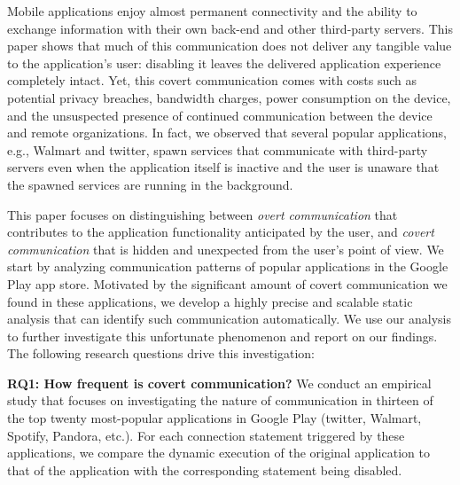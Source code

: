 Mobile applications enjoy almost permanent connectivity and the
ability to exchange information with their own back-end and other
third-party servers.  This paper shows that much of this communication
does not deliver any tangible value to the application's user:
disabling it leaves the delivered application experience completely
intact.  Yet, this covert communication comes with costs such as
potential privacy breaches, bandwidth charges, power consumption on
the device, and the unsuspected presence of continued communication
between the device and remote organizations. In fact, we observed that
several popular applications, e.g., Walmart and twitter, spawn
services that communicate with third-party servers even when the
application itself is inactive and the user is unaware that the
spawned services are running in the background.



This paper focuses on distinguishing between 
\emph{overt communication} that contributes to the application functionality anticipated by the user, and
\emph{covert communication} that is hidden and unexpected from the user's point of view.
We start by
analyzing communication patterns of
popular applications in the Google Play app store. Motivated by the significant
amount of covert communication we found in these applications, 
we develop a highly precise and scalable static analysis that can identify 
such communication automatically. We use our analysis to further 
investigate this unfortunate phenomenon and report on our findings. 
The following research questions drive this investigation:

\noindent 
{\bf RQ1: How frequent is covert communication?} %
We conduct an empirical study that focuses on %
investigating the nature of communication in thirteen of the 
top twenty most-popular applications in Google Play (twitter, Walmart,
Spotify, Pandora, etc.).  
For each connection statement triggered by these applications, we compare the dynamic execution of the original application to that of the application with the corresponding statement being disabled. 

